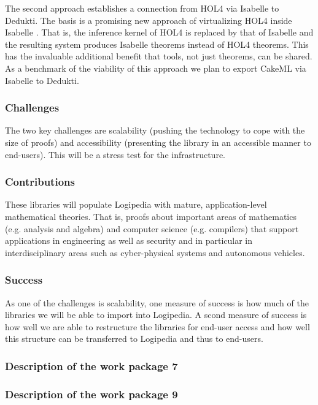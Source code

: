 The second approach establishes a connection from HOL4 via Isabelle to
Dedukti. The basis is a promising new approach of virtualizing HOL4
inside Isabelle \cite{ImmlerRW19}. That is, the inference
kernel of HOL4 is replaced by that of Isabelle and the resulting
system produces Isabelle theorems instead of HOL4 theorems. This has
the invaluable additional benefit that tools, not just theorems, can
be shared. As a benchmark of the viability of this approach we plan to
export CakeML via Isabelle to Dedukti.

\subsubsection*{Challenges}

The two key challenges are scalability (pushing the technology to cope
with the size of proofs) and accessibility (presenting the library in
an accessible manner to end-users). This will be a stress test for the
infrastructure.


\subsubsection*{Contributions}

These libraries will populate Logipedia with mature,
application-level mathematical theories. That is, proofs about
important areas of mathematics (e.g. analysis and algebra) and
computer science (e.g. compilers) that support applications in
engineering as well as security and in particular in interdisciplinary
areas such as cyber-physical systems and autonomous vehicles.

\subsubsection*{Success}

As one of the challenges is scalability, one measure of success is how
much of the libraries we will be able to import into Logipedia. A
scond measure of success is how well we are able to restructure the
libraries for end-user access and how well this structure can be
transferred to Logipedia and thus to end-users.


\subsubsection{Description of the work package 7}

\subsubsection{Description of the work package 9}

